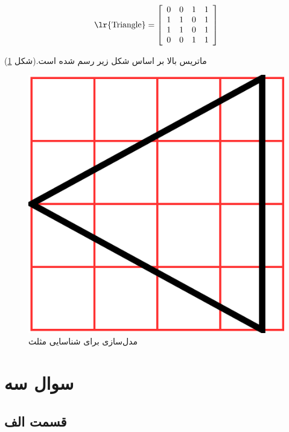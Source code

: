 \documentclass[14pt,a4]{article}
\begin{document}
\begin{itemize}
    \[
        \text{\lr{Triangle}} = \left[ \begin{array}{cccc}
        0 & 0 & 1 & 1 \\
        1 & 1 & 0 & 1 \\
        1 & 1 & 0 & 1 \\
        0 & 0 & 1 & 1 \\
        \end{array} \right]
    \]

    ماتریس بالا بر اساس شکل زیر رسم شده است.(شکل \ref{triangle-recongition})

    \begin{figure}[h]
        \centering
        \includegraphics[scale=0.5]{images/q2/triangle.png}
        \caption{مدل‌سازی برای شناسایی مثلث}
        \label{triangle-recongition}
    \end{figure}

\end{itemize}

\section*{سوال سه}

\subsection*{قسمت الف}
\end{document}
